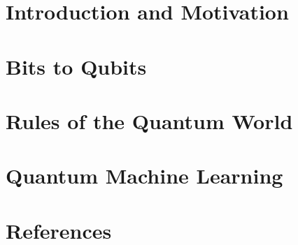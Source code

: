 
\section[Intro]{Introduction and Motivation}


\section[Bits]{Bits to Qubits}


\section[Rules]{Rules of the Quantum World}


% 

\section[QML]{Quantum Machine Learning}

% 

\section[Refs]{References}

